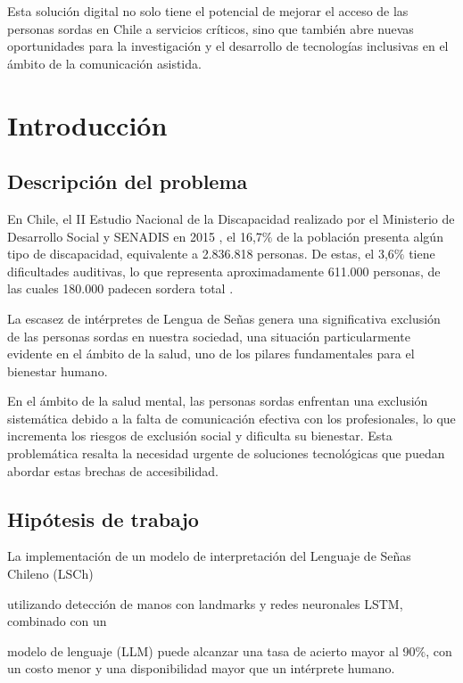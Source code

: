 \documentclass[10pt]{article}
\begin{document}
Esta solución digital no solo tiene el potencial de mejorar el acceso de las personas sordas en Chile a servicios críticos, sino que también abre nuevas oportunidades para la investigación y el desarrollo de tecnologías inclusivas en el ámbito de la comunicación asistida.

\vspace{1\baselineskip}
\section{Introducción}

\subsection{Descripción del problema}

En Chile, el II Estudio Nacional de la Discapacidad realizado por el Ministerio de Desarrollo Social y SENADIS en 2015 , el 16,7$\%$ de la población presenta algún tipo de discapacidad, equivalente a 2.836.818 personas. De estas, el 3,6$\%$ tiene dificultades auditivas, lo que representa aproximadamente 611.000 personas, de las cuales 180.000 padecen sordera total .

La escasez de intérpretes de Lengua de Señas genera una significativa exclusión de las personas sordas en nuestra sociedad, una situación particularmente evidente en el ámbito de la salud, uno de los pilares fundamentales para el bienestar humano.

En el ámbito de la salud mental, las personas sordas enfrentan una exclusión sistemática debido a la falta de comunicación efectiva con los profesionales, lo que incrementa los riesgos de exclusión social y dificulta su bienestar. Esta problemática resalta la necesidad urgente de soluciones tecnológicas que puedan abordar estas brechas de accesibilidad.

\subsection{Hipótesis de trabajo}

\vspace{1\baselineskip}
La implementación de un modelo de interpretación del Lenguaje de Señas Chileno (LSCh)

utilizando detección de manos con landmarks y redes neuronales LSTM, combinado con un

modelo de lenguaje (LLM) puede alcanzar una tasa de acierto mayor al 90$\%$, con un costo menor y una disponibilidad mayor que un intérprete humano.
\end{document}
